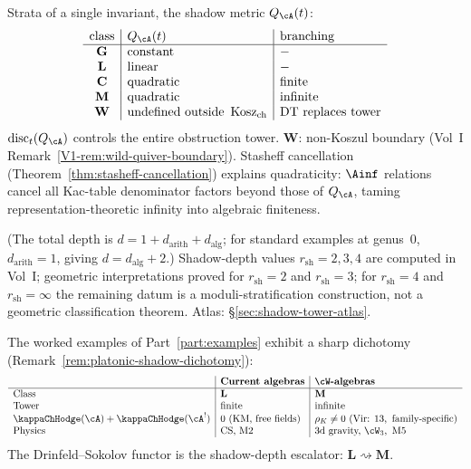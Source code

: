 Strata of a single invariant, the shadow metric $Q_\cA(t)$:
\[
\begin{array}{c|l|l}
\text{class} & Q_\cA(t) & \text{branching} \\
\hline
\mathbf{G} & \text{constant} & - \\
\mathbf{L} & \text{linear} & - \\
\mathbf{C} & \text{quadratic} & \text{finite} \\
\mathbf{M} & \text{quadratic} & \text{infinite} \\
\mathbf{W} & \text{undefined outside }\operatorname{Kosz}_{\mathrm{ch}} &
\text{DT replaces tower}
\end{array}
\]
$\mathrm{disc}_t(Q_\cA)$ controls the entire obstruction tower.
$\mathbf{W}$: non-Koszul boundary
(Vol~I Remark~\ref{V1-rem:wild-quiver-boundary}).
Stasheff cancellation
(Theorem~\ref{thm:stasheff-cancellation}) explains quadraticity:
$\Ainf$ relations cancel all Kac-table denominator factors
beyond those of $Q_\cA$, taming representation-theoretic
infinity into algebraic finiteness.

(The total depth is
$d = 1 + d_{\mathrm{arith}} + d_{\mathrm{alg}}$; for standard
examples at genus~$0$, $d_{\mathrm{arith}} = 1$, giving
$d = d_{\mathrm{alg}} + 2$.) Shadow-depth values
$r_{\mathrm{sh}} = 2, 3, 4$ are computed in Vol~I; geometric
interpretations proved for $r_{\mathrm{sh}} = 2$ and
$r_{\mathrm{sh}} = 3$; for $r_{\mathrm{sh}} = 4$ and
$r_{\mathrm{sh}} = \infty$ the
remaining datum is a moduli-stratification construction, not a
geometric classification theorem. Atlas:
\S\ref{sec:shadow-tower-atlas}.

The worked examples of Part~\ref{part:examples} exhibit a sharp
dichotomy (Remark~\ref{rem:platonic-shadow-dichotomy}):
\[
\begin{array}{l|l|l}
 & \textbf{Current algebras} & \textbf{$\cW$-algebras} \\
\hline
\text{Class} & \mathbf{L} & \mathbf{M} \\
\text{Tower} & \text{finite} & \text{infinite} \\
\kappaChHodge(\cA) + \kappaChHodge(\cA^!) & 0\ (\text{KM, free fields}) &
 \rho_K \neq 0\ (\text{Vir: }13,\text{ family-specific}) \\
\text{Physics} & \text{CS, M2} &
 \text{3d gravity, } \cW_3, \text{ M5}
\end{array}
\]
The Drinfeld--Sokolov functor is the shadow-depth escalator:
$\mathbf{L} \rightsquigarrow \mathbf{M}$.

